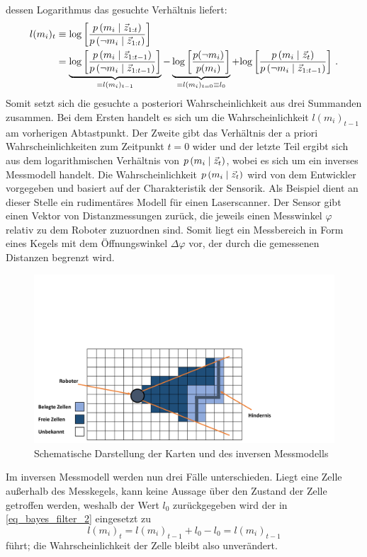 dessen Logarithmus das gesuchte Verhältnis liefert:
\begin{equation}
\label{eq_bayes_filter_2}
\begin{split}
l(m_i)_t &\equiv \text{log}\left[ { \frac{p\left({m_i} \hspace{1mm} \vert \hspace{1mm} {\vec{z}_{1:t}}\right)}{p\left({\neg m_i} \hspace{1mm} \vert \hspace{1mm} {\vec{z}_{1:t}}\right)} } \right]  \\
&= \underbrace{\text{log}\left[ { \frac{p\left({m_i} \hspace{1mm} \vert \hspace{1mm} {\vec{z}_{1:t-1}}\right)}{p\left({\neg m_i} \hspace{1mm} \vert \hspace{1mm} {\vec{z}_{1:t-1}}\right)} } \right]}_{= l(m_i)_{t-1}} 
- \underbrace{ \text{log}\left[ { \frac{p(\neg m_i)}{p(m_i)} } \right] }_{=l(m_i)_{t=0}\equiv l_0}
 + \text{log}\left[ { \frac{p\left({m_i} \hspace{1mm} \vert \hspace{1mm} {\vec{z}_t}\right)}{p\left({\neg m_i} \hspace{1mm} \vert \hspace{1mm} {\vec{z}_{1:t-1}}\right)} } \right]\,.
\end{split}
\end{equation}
Somit setzt sich die gesuchte a posteriori Wahrscheinlichkeit aus drei Summanden zusammen. Bei dem Ersten handelt es sich um die Wahrscheinlichkeit $l(m_i)_{t-1}$ am vorherigen Abtastpunkt. Der Zweite gibt das Verhältnis der a priori Wahrscheinlichkeiten zum Zeitpunkt $t=0$ wider und der letzte Teil ergibt sich aus dem logarithmischen Verhältnis von $p\left({m_i} \hspace{1mm} \vert \hspace{1mm} {\vec{z}_t}\right)$, wobei es sich um ein inverses Messmodell handelt. Die Wahrscheinlichkeit $p\left({m_i} \hspace{1mm} \vert \hspace{1mm} {\vec{z}_t}\right)$ wird von dem Entwickler vorgegeben und basiert auf der Charakteristik der Sensorik.
Als Beispiel dient an dieser Stelle ein rudimentäres Modell für einen Laserscanner. Der Sensor gibt einen Vektor von Distanzmessungen zurück, die jeweils einen Messwinkel $\varphi$ relativ zu dem Roboter zuzuordnen sind. Somit liegt ein Messbereich in Form eines Kegels mit dem Öffnungswinkel $\Delta \varphi$ vor, der durch die gemessenen Distanzen begrenzt wird.
\begin{figure}[!ht]
\centering
\includegraphics[width=0.7\linewidth, trim={0cm 0cm 7cm 8cm}, clip]{img/Bilder_Karten_InvSensModel_1}
\caption{Schematische Darstellung der Karten und des inversen Messmodells}
\end{figure}
Im inversen Messmodell werden nun drei Fälle unterschieden. Liegt eine Zelle außerhalb des Messkegels, kann keine Aussage über den Zustand der Zelle getroffen werden, weshalb der Wert $l_0$ zurückgegeben wird der in \ref{eq_bayes_filter_2} eingesetzt zu 
\begin{equation}
l(m_i)_t = l(m_i)_{t-1} + l_0 - l_0 = l(m_i)_{t-1}
\end{equation}
führt; die Wahrscheinlichkeit der Zelle bleibt also unverändert. 

